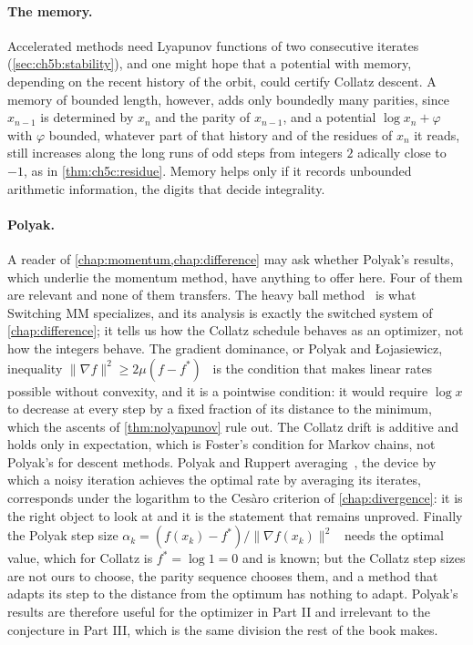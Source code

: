 \paragraph{The memory.} Accelerated methods need Lyapunov functions of two
consecutive iterates (\cref{sec:ch5b:stability}), and one might hope that a
potential with memory, depending on the recent history of the orbit, could
certify Collatz descent.
A memory of bounded length, however, adds only boundedly many parities, since $x_{n-1}$ is determined by $x_n$ and the parity of $x_{n-1}$, and a potential $\log x_n+\varphi$ with $\varphi$ bounded, whatever part of that history and of the residues of $x_n$ it reads, still increases along the long runs of odd steps from integers $2$ adically close to $-1$, as in \cref{thm:ch5c:residue}.
Memory helps only if it records unbounded
arithmetic information, the digits that decide integrality.

\paragraph{Polyak.} A reader of \cref{chap:momentum,chap:difference} may ask
whether Polyak's results, which underlie the momentum method, have anything
to offer here. Four of them are relevant and none of them transfers. The heavy
ball method~\cite{polyak1964} is what Switching MM specializes, and its analysis is exactly
the switched system of \cref{chap:difference}; it tells us how the Collatz
schedule behaves as an optimizer, not how the integers behave. The gradient
dominance, or Polyak and \L{}ojasiewicz, inequality
$\|\nabla f\|^2\ge2\mu(f-f^\ast)$~\cite{polyak1987} is the condition that makes linear rates
possible without convexity, and it is a pointwise condition: it would require
$\log x$ to decrease at every step by a fixed fraction of its distance to the
minimum, which the ascents of \cref{thm:nolyapunov} rule out. The Collatz
drift is additive and holds only in expectation, which is Foster's condition
for Markov chains, not Polyak's for descent methods. Polyak and Ruppert
averaging~\cite{ruppert1988,polyak1990,polyak1992}, the device by which a noisy iteration achieves the optimal rate by
averaging its iterates, corresponds under the logarithm to the Ces\`aro
criterion of \cref{chap:divergence}: it is the right object to look at and it
is the statement that remains unproved. Finally the Polyak step size
$\alpha_k=(f(x_k)-f^\ast)/\|\nabla f(x_k)\|^2$~\cite{polyak1987} needs the optimal value, which
for Collatz is $f^\ast=\log1=0$ and is known; but the Collatz step sizes are
not ours to choose, the parity sequence chooses them, and a method that
adapts its step to the distance from the optimum has nothing to adapt.
Polyak's results are therefore useful for the optimizer in Part II and
irrelevant to the conjecture in Part III, which is the same division the rest
of the book makes.


